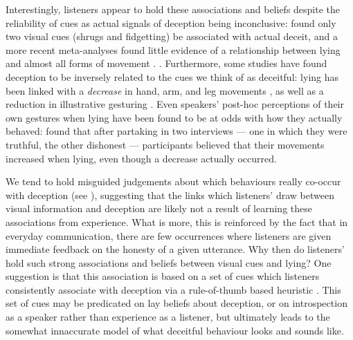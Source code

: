 \documentclass[a4paper,man,natbib]{apa6}
\begin{document}
Interestingly, listeners appear to hold these associations and beliefs despite the reliability of cues as actual signals of deception being inconclusive: \citet{Zuckerman1981} found only two visual cues (shrugs and fidgetting) be associated with actual deceit, and a  more recent meta-analyses found little evidence of a relationship between lying and almost all forms of movement \citet{DePaulo2003}.
. %
Furthermore, some studies have found deception to be inversely related to the cues we think of as deceitful: lying has been linked with a \emph{decrease} in hand, arm, and leg movements \citep[e.g.][]{DePaulo1992, Ekman1989, Vrij1995}, as well as a reduction in illustrative gesturing \citep[e.g.][]{DePaulo2003, Cohen2010}.
Even speakers' post-hoc perceptions of their own gestures when lying have been found to be at odds with how they actually behaved:
\citet{Vrij1996} found that after partaking in two interviews --- one in which they were truthful, the other dishonest --- participants believed that their movements increased when lying, even though a decrease actually occurred.

We tend to hold misguided judgements about which behaviours really co-occur with deception (see \citet{Vrij2000}), suggesting that the links which listeners' draw between visual information and deception are likely not a result of learning these associations from experience.
What is more, this is reinforced by the fact that in everyday communication, there are few occurrences where listeners are given immediate feedback on the honesty of a given utterance.
Why then do listeners' hold such strong associations and beliefs between visual cues and lying?
One suggestion is that this association is based on a set of cues which listeners consistently associate with deception via a rule-of-thumb based heuristic \citep{DePaulo1982}.
This set of cues may be predicated on lay beliefs about deception, or on introspection as a speaker rather than experience as a listener, but ultimately leads to the somewhat innaccurate model of what deceitful behaviour looks and sounds like. 
\end{document}
